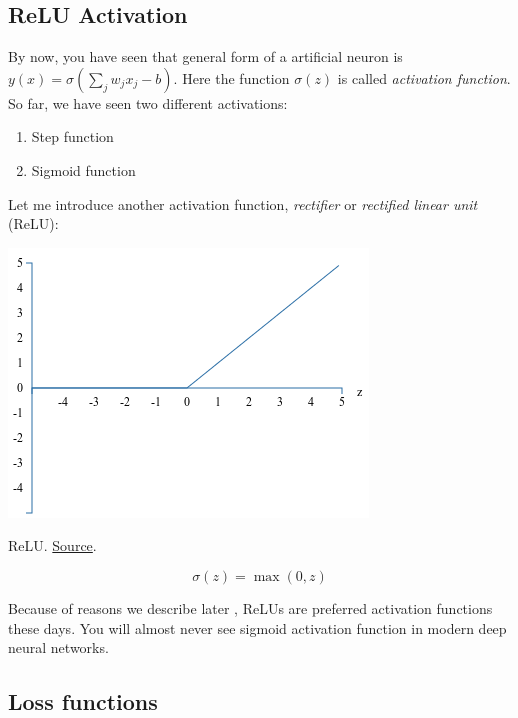 \documentclass[a4paper]{tufte-handout}
\begin{document}
\subsection{ReLU Activation}

By now, you have seen that general form of a artificial neuron is
\(y(x) = \sigma\left(\sum_j w_j x_j - b\right)\).
Here the function \(\sigma(z)\) is called \emph{activation
function}. So far, we have seen two different activations:

\begin{enumerate}
\item
  Step function
\item
  Sigmoid function
\end{enumerate}


Let me introduce another activation function, \emph{rectifier} or
\emph{rectified linear unit} (ReLU):

\begin{marginfigure}
\includegraphics[width=\linewidth]{relu}
\caption{ ReLU.
\href{http://neuralnetworksanddeeplearning.com/chap3.html}{Source}. }
\end{marginfigure}

\[\sigma(z) = \max(0, z)\]

Because of reasons we describe later
,
ReLUs are preferred activation functions these days. You will almost
never see sigmoid activation function in modern deep neural networks.

\subsection{Loss functions}
\end{document}
